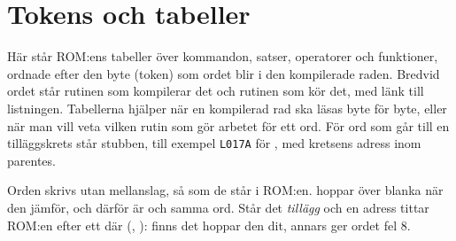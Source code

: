
\chapter{Tokens och tabeller}\label{bil:tokens}
\noindent Här står ROM:ens tabeller över kommandon, satser, operatorer
och funktioner, ordnade efter den byte (token) som ordet blir i den
kompilerade raden. Bredvid ordet står rutinen som kompilerar det och
rutinen som kör det, med länk till listningen. Tabellerna hjälper när en
kompilerad rad ska läsas byte för byte, eller när man vill veta vilken
rutin som gör arbetet för ett ord. För ord som går till en tilläggskrets
står stubben, till exempel \texttt{L017A} för , med kretsens
adress inom parentes.
\par\smallskip\noindent Orden skrivs utan mellanslag, så som de står i
ROM:en.  hoppar över blanka när den jämför, och därför är
 och  samma ord. Står det \emph{tillägg}
och en adress tittar ROM:en efter ett  där
(, ): finns det hoppar den dit, annars ger
ordet fel 8.
